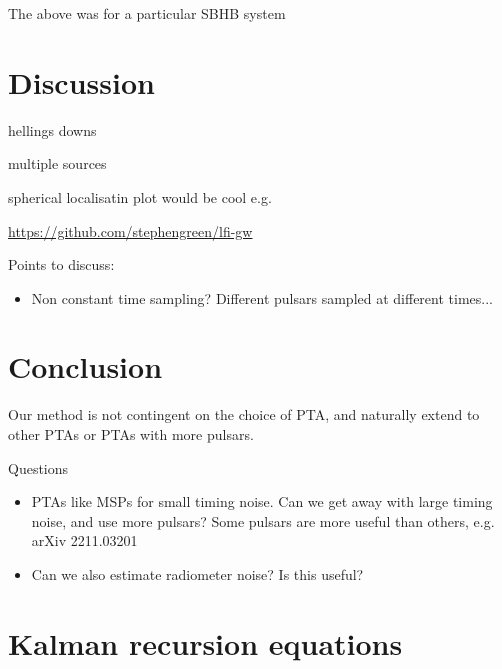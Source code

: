 \documentclass[fleqn,usenatbib,useAMS]{mnras}
\begin{document}
The above was for a particular SBHB system


\section{Discussion}


hellings downs 


multiple sources


spherical localisatin plot would be cool e.g. 


\url{https://github.com/stephengreen/lfi-gw}


Points to discuss:

\begin{itemize}
	\item Non constant time sampling? Different pulsars sampled at different times...
\end{itemize}

\section{Conclusion}

Our method is not contingent on the choice of PTA, and naturally extend to other PTAs or PTAs with more pulsars. 

Questions 

\begin{itemize}
	\item PTAs like MSPs for small timing noise. Can we get away with large timing noise, and use more pulsars? Some pulsars are more useful than others, e.g. arXiv 2211.03201
	\item Can we also estimate radiometer noise? Is this useful?
\end{itemize}




 \newpage 
\appendix

\section{Kalman recursion equations} \label{sec:kalman}
\end{document}
